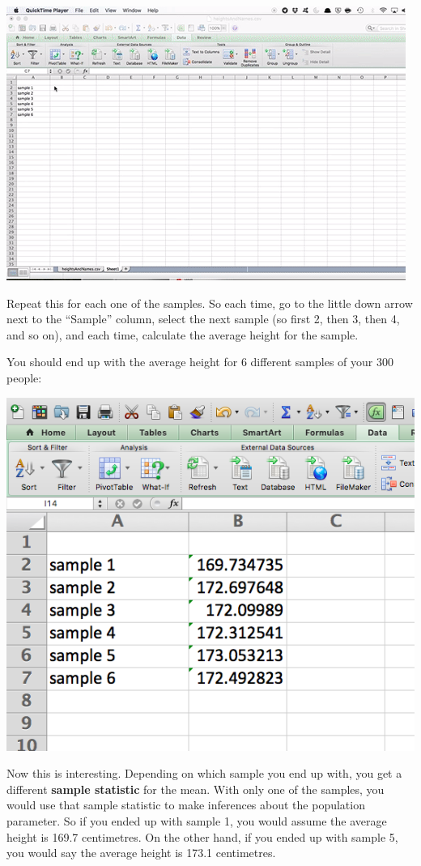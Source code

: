 \documentclass[
]{book}
\begin{document}
\includegraphics{imgs/avg_sample_1.gif}

Repeat this for each one of the samples. So each time, go to the little down arrow next to the ``Sample'' column, select the next sample (so first 2, then 3, then 4, and so on), and each time, calculate the average height for the sample.

You should end up with the average height for 6 different samples of your 300 people:

\includegraphics{imgs/avg_per_sample.png}

Now this is interesting. Depending on which sample you end up with, you get a different \textbf{sample statistic} for the mean. With only one of the samples, you would use that sample statistic to make inferences about the population parameter. So if you ended up with sample 1, you would assume the average height is 169.7 centimetres. On the other hand, if you ended up with sample 5, you would say the average height is 173.1 centimetres.
\end{document}
